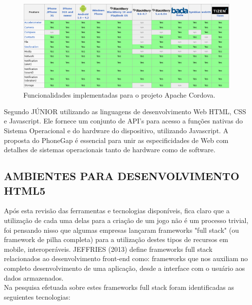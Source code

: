 \documentclass{article}
\begin{document}
\begin{figure}[!htbp]
    \begin{center}
        \includegraphics[width=\textwidth]{asset/img/cordovaFeatures.jpg}
        \caption{Funcionalidades implementadas para o projeto Apache Cordova.\label{fig:Cordova}}
    \end{center}
\end{figure}
Segundo JÚNIOR  utilizando as linguagens de desenvolvimento Web HTML, CSS e Javascript. Ele fornece um conjunto de API's para acesso a funções nativas do Sistema Operacional e do hardware do dispositivo, utilizando Javascript. A proposta do PhoneGap é essencial para unir as especificidades de Web com detalhes de sistemas operacionais tanto de hardware como de software.


\subsection{AMBIENTES PARA DESENVOLVIMENTO HTML5}

Após esta revisão das ferramentas  e tecnologias disponíveis, fica claro que a utilização de cada uma delas para a criação de um jogo não é um processo trivial, foi pensando nisso que algumas empresas lançaram frameworks "full stack"  (ou framework de pilha completa) para a utilização destes tipos de recursos em mobile, interoperáveis. JEFFRIES (2013) define frameworks full stack relacionados ao desenvolvimento front-end como: frameworks que nos auxiliam no completo desenvolvimento de uma aplicação, desde a interface com o usuário aos dados armazenados.
\\
Na pesquisa efetuada sobre estes frameworks full stack foram identificadas as seguientes tecnologias:
\end{document}
